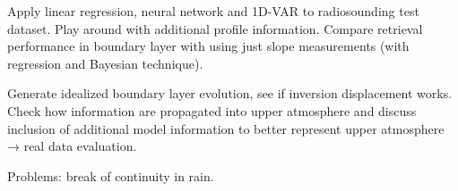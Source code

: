 \startsection[title=Comparison of Retrievals and Radiosoundings]

    Apply linear regression, neural network and 1D-VAR to radiosounding test
    dataset. Play around with additional profile information. Compare
    retrieval performance in boundary layer with using just slope measurements
    (with regression and Bayesian technique).

\stopsection


\startsection[title=An Idealized Experiment with Time-Continuous Retrieval]

    Generate idealized boundary layer evolution, see if inversion displacement
    works. Check how information are propagated into upper atmosphere and
    discuss inclusion of additional model information to better represent upper
    atmosphere → real data evaluation.

    Problems: break of continuity in rain.
    
\stopsection

